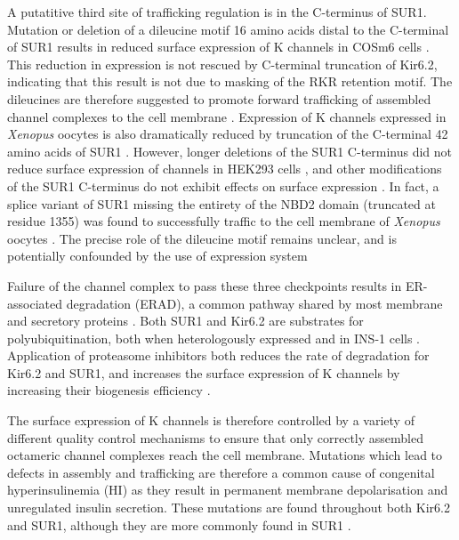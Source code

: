 A putatitive third site of trafficking regulation is in the C-terminus of SUR1.
Mutation or deletion of a dileucine motif 16 amino acids distal to the C-terminal of SUR1 results in reduced surface expression of K\ATP{} channels in COSm6 cells \cite{sharma_c_1999}.
This reduction in expression is not rescued by C-terminal truncation of Kir6.2, indicating that this result is not due to masking of the RKR retention motif.
The dileucines are therefore suggested to promote forward trafficking of assembled channel complexes to the cell membrane \cite{sharma_c_1999}.
Expression of K\ATP{} channels expressed in \textit{Xenopus} oocytes is also dramatically reduced by truncation of the C-terminal 42 amino acids of SUR1 \cite{vedovato_role_2018}.
However, longer deletions of the SUR1 C-terminus did not reduce surface expression of channels in HEK293 cells \cite{giblin_cytoplasmic_2002}, and other modifications of the SUR1 C-terminus do not exhibit effects on surface expression \cite{schwappach_molecular_2000}.
In fact, a splice variant of SUR1 missing the entirety of the NBD2 domain (truncated at residue 1355) was found to successfully traffic to the cell membrane of \textit{Xenopus} oocytes \cite{sakura_altered_1999-1}.
The precise role of the dileucine motif remains unclear, and is potentially confounded by the use of expression system \cite{giblin_cytoplasmic_2002, martin_pharmacological_2013}

Failure of the channel complex to pass these three checkpoints results in ER-associated degradation (ERAD), a common pathway shared by most membrane and secretory proteins \cite{bonifacino_ubiquitin_1998, yan_role_2005}.
Both SUR1 and Kir6.2 are substrates for polyubiquitination, both when heterologously expressed and in INS-1 cells \cite{yan_role_2005}.
Application of proteasome inhibitors both reduces the rate of degradation for Kir6.2 and SUR1, and increases the surface expression of K\ATP{} channels by increasing their biogenesis efficiency \cite{yan_role_2005}.

The surface expression of K\ATP{} channels is therefore controlled by a variety of different quality control mechanisms to ensure that only correctly assembled octameric channel complexes reach the cell membrane.
Mutations which lead to defects in assembly and trafficking are therefore a common cause of congenital hyperinsulinemia (HI) as they result in permanent membrane depolarisation and unregulated insulin secretion.
These mutations are found throughout both Kir6.2 and SUR1, although they are more commonly found in SUR1 \cite{martin_pharmacological_2013}.

